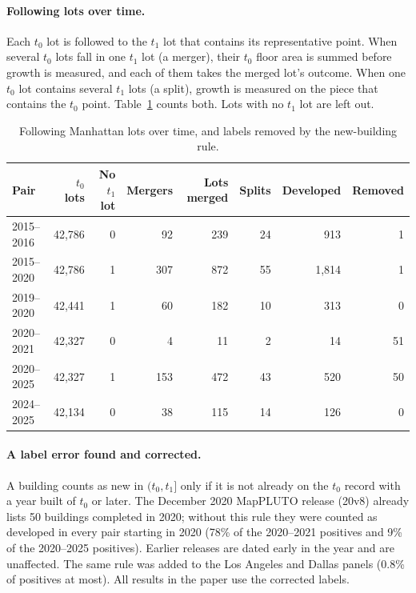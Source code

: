 \documentclass[10pt]{article}
\begin{document}
\paragraph{Following lots over time.} Each $t_0$ lot is followed to the $t_1$ lot that contains its representative
point. When several $t_0$ lots fall in one $t_1$ lot (a merger), their $t_0$ floor area is summed before growth is
measured, and each of them takes the merged lot's outcome. When one $t_0$ lot contains several $t_1$ lots (a split),
growth is measured on the piece that contains the $t_0$ point. Table~\ref{tab:s-identity} counts both. Lots with no
$t_1$ lot are left out.

\begin{table}[t]
\centering
\footnotesize
\setlength{\tabcolsep}{4pt}
\caption{Following Manhattan lots over time, and labels removed by the new-building rule.}
\label{tab:s-identity}
\begin{tabular}{lrrrrrrr}
\toprule
Pair & $t_0$ lots & No $t_1$ lot & Mergers & Lots merged & Splits & Developed & Removed \\
\midrule
2015--2016 & 42{,}786 & 0 & 92 & 239 & 24 & 913 & 1 \\
2015--2020 & 42{,}786 & 1 & 307 & 872 & 55 & 1{,}814 & 1 \\
2019--2020 & 42{,}441 & 1 & 60 & 182 & 10 & 313 & 0 \\
2020--2021 & 42{,}327 & 0 & 4 & 11 & 2 & 14 & 51 \\
2020--2025 & 42{,}327 & 1 & 153 & 472 & 43 & 520 & 50 \\
2024--2025 & 42{,}134 & 0 & 38 & 115 & 14 & 126 & 0 \\
\bottomrule
\end{tabular}
\end{table}

\paragraph{A label error found and corrected.} A building counts as new in $(t_0, t_1]$ only if it is not already on
the $t_0$ record with a year built of $t_0$ or later. The December 2020 MapPLUTO release (20v8) already lists
50 buildings completed in 2020; without this rule they were counted as developed in every pair starting
in 2020 (78\% of the 2020--2021 positives and 9\% of the 2020--2025 positives).
Earlier releases are dated early in the year and are unaffected. The same rule was added to the Los Angeles and Dallas
panels (0.8\% of positives at most). All results in the paper use the corrected labels.
\end{document}
